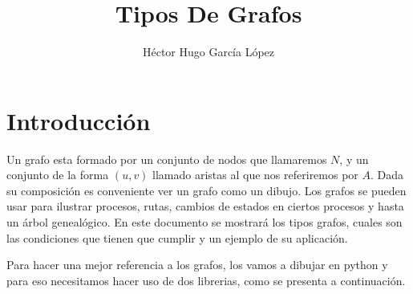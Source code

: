 \documentclass{article}
\title{Tipos De Grafos}
\author{Héctor Hugo García López}
\date{}
\begin{document}
\maketitle

\section*{Introducción}
Un grafo esta formado por un conjunto de nodos que llamaremos $N$, y un conjunto de la forma $(u,v)$ llamado aristas al que nos referiremos por $A$. Dada su composición es conveniente ver un grafo como un dibujo. Los grafos se pueden usar para ilustrar procesos, rutas, cambios de estados en ciertos procesos  y hasta un árbol genealógico. En este documento se mostrará los tipos grafos, cuales son las condiciones que tienen que cumplir y un ejemplo de su aplicación.

Para hacer una mejor referencia a los grafos, los vamos a dibujar en python y para eso necesitamos hacer uso de dos librerias, como se presenta a continuación.
\end{document}
